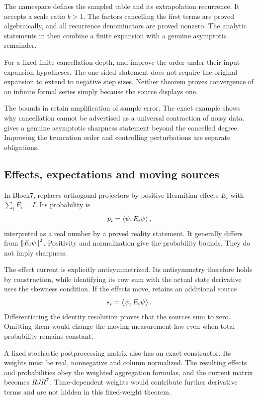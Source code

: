 The namespace  defines the sampled table and its extrapolation recurrence. It accepts a scale ratio \(b>1\). The factors cancelling the first terms are proved algebraically, and all recurrence denominators are proved nonzero. The analytic statements in  then combine a finite expansion with a genuine asymptotic remainder.

For a fixed finite cancellation depth,  and  improve the order under their input expansion hypotheses. The one-sided statement does not require the original expansion to extend to negative step sizes. Neither theorem proves convergence of an infinite formal series simply because the source displays one.

The bounds in  retain amplification of sample error. The exact example  shows why cancellation cannot be advertised as a universal contraction of noisy data.  gives a genuine asymptotic sharpness statement beyond the cancelled degree. Improving the truncation order and controlling perturbations are separate obligations.

\subsection{Effects, expectations and moving sources}

In Block7,  replaces orthogonal projectors by positive Hermitian effects \(E_i\) with \(\sum_iE_i=I\). Its probability is
\[
 p_i=\left\langle\psi,E_i\psi\right\rangle,
\]
interpreted as a real number by a proved reality statement. It generally differs from \(\left\lVert E_i\psi\right\rVert^2\). Positivity and normalization give the probability bounds. They do not imply sharpness.

The effect current is explicitly antisymmetrized. Its antisymmetry therefore holds by construction, while identifying its row sum with the actual state derivative uses the skewness condition. If the effects move,  retains an additional source
\[
 s_i=\left\langle\psi,\dot E_i\psi\right\rangle.
\]
Differentiating the identity resolution proves that the sources sum to zero. Omitting them would change the moving-measurement law even when total probability remains constant.

A fixed stochastic postprocessing matrix also has an exact constructor. Its weights must be real, nonnegative and column normalized. The resulting effects and probabilities obey the weighted aggregation formulas, and the current matrix becomes \(RJR^{\mathsf T}\). Time-dependent weights would contribute further derivative terms and are not hidden in this fixed-weight theorem.

